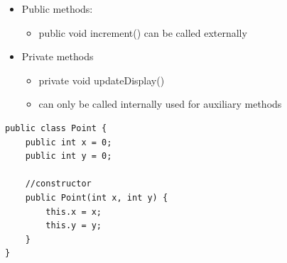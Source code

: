 \documentclass{beamer}
\begin{document}
\begin{frame}

\begin{itemize}
\item Public methods:

\begin{itemize}
\item public void increment() can be called externally
\end{itemize}
\item Private methods

\begin{itemize}
\item private void updateDisplay()
\item can only be called internally used for auxiliary methods
\end{itemize}
\end{itemize}

\end{frame}

\begin{frame}[fragile]

\begin{block}{}
\begin{lstlisting}
public class Point {
    public int x = 0;
    public int y = 0;
        
    //constructor
    public Point(int x, int y) {
        this.x = x;
        this.y = y;
    }
}
\end{lstlisting}
\end{block}

\end{frame}
\end{document}
